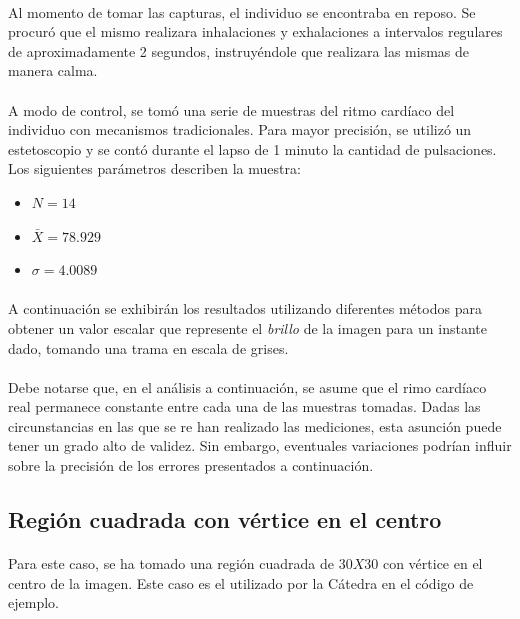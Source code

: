 \documentclass[12pt, twocolumn]{article}
\begin{document}
	\paragraph{} Al momento de tomar las capturas, el individuo se encontraba en reposo. Se procuró que el mismo realizara inhalaciones y exhalaciones a intervalos regulares de aproximadamente 2 segundos, instruyéndole que realizara las mismas de manera calma.
	
	\paragraph{} A modo de control, se tomó una serie de muestras del ritmo cardíaco del individuo con mecanismos tradicionales. Para mayor precisión, se utilizó un estetoscopio y se contó durante el lapso de 1 minuto la cantidad de pulsaciones. Los siguientes parámetros describen la muestra:
	
	\begin{itemize}
		\item $N = 14$
		\item $\bar{X} = 78.929$
		\item $\sigma = 4.0089$
	\end{itemize}
	
	\paragraph{} A continuación se exhibirán los resultados utilizando diferentes métodos para obtener un valor escalar que represente el \textit{brillo} de la imagen para un instante dado, tomando una trama en escala de grises. 
	
	\paragraph{} Debe notarse que, en el análisis a continuación, se asume que el rimo cardíaco real permanece constante entre cada una de las muestras tomadas. Dadas las circunstancias en las que se re han realizado las mediciones, esta asunción puede tener un grado alto de validez. Sin embargo, eventuales variaciones podrían influir sobre la precisión de los errores presentados a continuación.
	
	\subsection{Región cuadrada con vértice en el centro}
	
	\paragraph{} Para este caso, se ha tomado una región cuadrada de $30X30$ con vértice en el centro de la imagen. Este caso es el utilizado por la Cátedra en el código de ejemplo.
	
\end{document}
